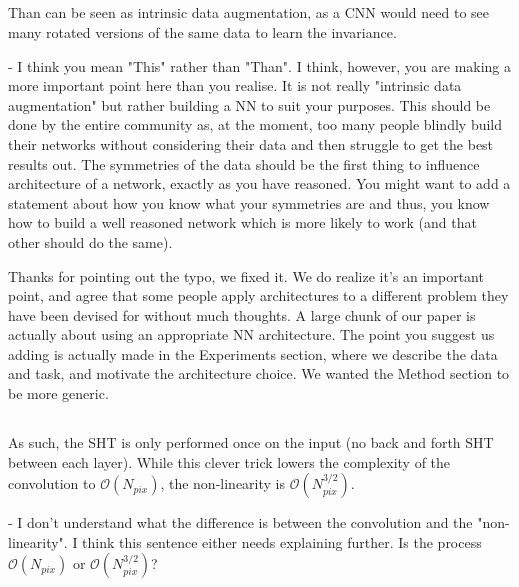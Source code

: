 \documentclass[12pt,a4paper]{article}
\newcommand{\mdeff}[1]{{\color[rgb]{.1,.6,.1}{MD: #1}}}
\newcommand{\1}{\b{1}}              %
\newcommand{\0}{\b{0}}              %
\begin{document}
\subsection{}
\begin{mdframed}[style=comment]
Than can be seen as intrinsic data augmentation, as a CNN would need to see many rotated versions of the same data to learn the invariance.

- I think you mean "This" rather than "Than". I think, however, you are making a more important point here than you realise. It is not really "intrinsic data augmentation" but rather building a NN to suit your purposes. This should be done by the entire community as, at the moment, too many people blindly build their networks without considering their data and then struggle to get the best results out. The symmetries of the data should be the first thing to influence architecture of a network, exactly as you have reasoned. You might want to add a statement about how you know what your symmetries are and thus, you know how to build a well reasoned network which is more likely to work (and that other should do the same).
\end{mdframed}

Thanks for pointing out the typo, we fixed it.
We do realize it's an important point, and agree that some people apply architectures to a different problem they have been devised for without much thoughts.
A large chunk of our paper is actually about using an appropriate NN architecture.
The point you suggest us adding is actually made in the Experiments section, where we describe the data and task, and motivate the architecture choice.
We wanted the Method section to be more generic.

\subsection{}
\begin{mdframed}[style=comment]
As such, the SHT is only performed once on the input (no back and forth SHT between each layer). While this clever trick lowers the complexity of the convolution to $\mathcal{O}(N_{pix})$, the non-linearity is $\mathcal{O}(N^{3/2}_{pix})$.

- I don't understand what the difference is between the convolution and the "non-linearity". I think this sentence either needs explaining further. Is the process $\mathcal{O}(N_{pix})$ or $\mathcal{O}(N^{3/2}_{pix})$?
\end{mdframed}
\end{document}
